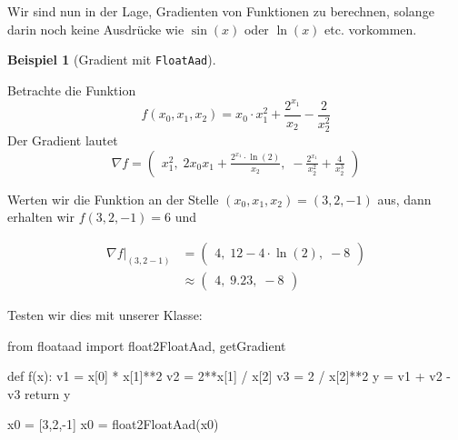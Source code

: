 \documentclass[
  a4paper,
  DIV=11]{scrreprt}
\newenvironment{Shaded}{\begin{snugshade}}{\end{snugshade}}
\newcommand{\ControlFlowTok}[1]{\textcolor[rgb]{0.00,0.23,0.31}{#1}}
\newcommand{\DecValTok}[1]{\textcolor[rgb]{0.68,0.00,0.00}{#1}}
\newcommand{\ImportTok}[1]{\textcolor[rgb]{0.00,0.46,0.62}{#1}}
\newcommand{\KeywordTok}[1]{\textcolor[rgb]{0.00,0.23,0.31}{#1}}
\newcommand{\NormalTok}[1]{\textcolor[rgb]{0.00,0.23,0.31}{#1}}
\newcommand{\OperatorTok}[1]{\textcolor[rgb]{0.37,0.37,0.37}{#1}}
\theoremstyle{definition}
\theoremstyle{definition}
\newtheorem{example}{Beispiel}[chapter]
\theoremstyle{remark}
\begin{document}
Wir sind nun in der Lage, Gradienten von Funktionen zu berechnen,
solange darin noch keine Ausdrücke wie \(\sin(x)\) oder \(\ln(x)\) etc.
vorkommen.

\begin{example}[Gradient mit
\texttt{FloatAad}]\protect\hypertarget{exm-gradientsWithAAD}{}\label{exm-gradientsWithAAD}

Betrachte die Funktion \[
f(x_0, x_1, x_2) = x_0 \cdot x_1^2 + \frac{2 ^{x_1}}{x_2} - \frac{2}{x_2^2}
\] Der Gradient lautet \[
\nabla f = \begin{pmatrix} 
    x_1^2  , \;
    2x_0x_1 + \frac{2^{x_1}\cdot\ln(2)}{x_2} , \;
    -\frac{2^{x_1}}{x_2^2}+\frac{4}{x_2^3}
    \end{pmatrix}
\]

Werten wir die Funktion an der Stelle \((x_0, x_1, x_2) = (3, 2, -1)\)
aus, dann erhalten wir \(f(3, 2, -1) = 6\) und

\begin{align*}
\nabla f|_{(3, 2 -1)} &= \begin{pmatrix} 
    4  , \;
    12-4\cdot \ln(2) ,\;
     -8
    \end{pmatrix} \\
    &\approx \begin{pmatrix} 
    4  , \;
    9.23 , \;
     -8
    \end{pmatrix}
\end{align*}

Testen wir dies mit unserer Klasse:

\begin{Shaded}
\begin{Highlighting}[]
\ImportTok{from}\NormalTok{ floataad }\ImportTok{import}\NormalTok{ float2FloatAad, getGradient}

\KeywordTok{def}\NormalTok{ f(x):}
\NormalTok{    v1 }\OperatorTok{=}\NormalTok{ x[}\DecValTok{0}\NormalTok{] }\OperatorTok{*}\NormalTok{ x[}\DecValTok{1}\NormalTok{]}\OperatorTok{**}\DecValTok{2}
\NormalTok{    v2 }\OperatorTok{=} \DecValTok{2}\OperatorTok{**}\NormalTok{x[}\DecValTok{1}\NormalTok{] }\OperatorTok{/}\NormalTok{ x[}\DecValTok{2}\NormalTok{]}
\NormalTok{    v3 }\OperatorTok{=} \DecValTok{2} \OperatorTok{/}\NormalTok{ x[}\DecValTok{2}\NormalTok{]}\OperatorTok{**}\DecValTok{2}
\NormalTok{    y }\OperatorTok{=}\NormalTok{ v1 }\OperatorTok{+}\NormalTok{ v2 }\OperatorTok{{-}}\NormalTok{ v3}
    \ControlFlowTok{return}\NormalTok{ y}

\NormalTok{x0 }\OperatorTok{=}\NormalTok{ [}\DecValTok{3}\NormalTok{,}\DecValTok{2}\NormalTok{,}\OperatorTok{{-}}\DecValTok{1}\NormalTok{]}
\NormalTok{x0 }\OperatorTok{=}\NormalTok{ float2FloatAad(x0)}


\end{Highlighting}
\end{Shaded}
\end{example}
\end{document}
